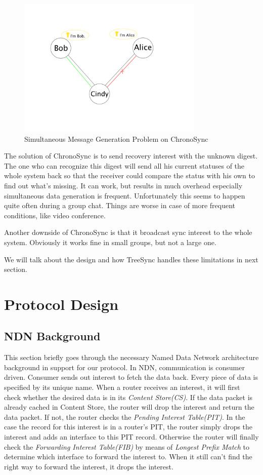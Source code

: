 \documentclass[conference]{IEEEtran}
\begin{document}
\begin{figure}[!t]
\centering
\includegraphics[width=3.5in]{../png/simultaneous.png}
\caption{Simultaneous Message Generation Problem on ChronoSync}
\label{simultaneous}
\end{figure}

The solution of ChronoSync is to send recovery interest with the unknown digest.
The one who can recognize this digest will send all his current statuses of the whole system back
so that the receiver could compare the status with his own to find out what's missing.
It can work, but results in much overhead especially simultaneous data generation is frequent.
Unfortunately this seems to happen quite often during a group chat.
Things are worse in case of more frequent conditions, like video conference.

Another downside of ChronoSync is that it broadcast sync interest to the whole system.
Obviously it works fine in small groups, but not a large one.

We will talk about the design and how TreeSync handles these limitations in next section.


\section{Protocol Design}
\label{design}

\subsection{NDN Background}
This section briefly goes through the necessary Named Data Network architecture background in support for our protocol.
In NDN, communication is consumer driven.
Consumer sends out interest to fetch the data back.
Every piece of data is specified by its unique name. When a router receives an interest,
it will first check whether the desired data is in its \emph{Content Store(CS)}.
If the data packet is already cached in Content Store,
the router will drop the interest and return the data packet.
If not, the router checks the \emph{Pending Interest Table(PIT)}.
In the case the record for this interest is in a router's PIT,
the router simply drops the interest and adds an interface to this PIT record.
Otherwise the router will finally check the \emph{Forwarding Interest Table(FIB)}
by means of \emph{Longest Prefix Match} to determine which interface to forward the interest to.
When it still can't find the right way to forward the interest, it drops the interest.
\end{document}
